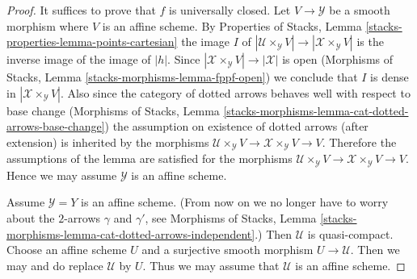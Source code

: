 \documentclass{stacks-project}
\theoremstyle{plain}
\theoremstyle{definition}
\theoremstyle{remark}
\numberwithin{equation}{subsection}
\begin{document}
\begin{proof}
It suffices to prove that $f$ is universally closed.
Let $V \to \mathcal{Y}$ be a smooth morphism where $V$ is an affine scheme.
By Properties of Stacks, Lemma
\ref{stacks-properties-lemma-points-cartesian}
the image $I$ of
$|\mathcal{U} \times_\mathcal{Y} V| \to |\mathcal{X} \times_\mathcal{Y} V|$
is the inverse image of the image of $|h|$. Since
$|\mathcal{X} \times_\mathcal{Y} V| \to |\mathcal{X}|$ is open
(Morphisms of Stacks, Lemma \ref{stacks-morphisms-lemma-fppf-open})
we conclude that $I$ is dense in $|\mathcal{X} \times_\mathcal{Y} V|$.
Also since the category of dotted arrows behaves well with respect
to base change (Morphisms of Stacks, Lemma
\ref{stacks-morphisms-lemma-cat-dotted-arrows-base-change})
the assumption on existence of dotted arrows (after extension)
is inherited by the morphisms
$\mathcal{U} \times_\mathcal{Y} V \to \mathcal{X} \times_\mathcal{Y} V \to V$.
Therefore the assumptions of the lemma are
satisfied for the morphisms
$\mathcal{U} \times_\mathcal{Y} V \to \mathcal{X} \times_\mathcal{Y} V \to V$.
Hence we may assume $\mathcal{Y}$ is an affine scheme.

\medskip\noindent
Assume $\mathcal{Y} = Y$ is an affine scheme.
(From now on we no longer have to worry about the
$2$-arrows $\gamma$ and $\gamma'$, see Morphisms of Stacks, Lemma
\ref{stacks-morphisms-lemma-cat-dotted-arrows-independent}.)
Then $\mathcal{U}$ is quasi-compact. Choose an affine scheme $U$ and a
surjective smooth morphism $U \to \mathcal{U}$.
Then we may and do replace $\mathcal{U}$ by $U$.
Thus we may assume that $\mathcal{U}$ is an affine scheme.


\end{proof}
\end{document}
